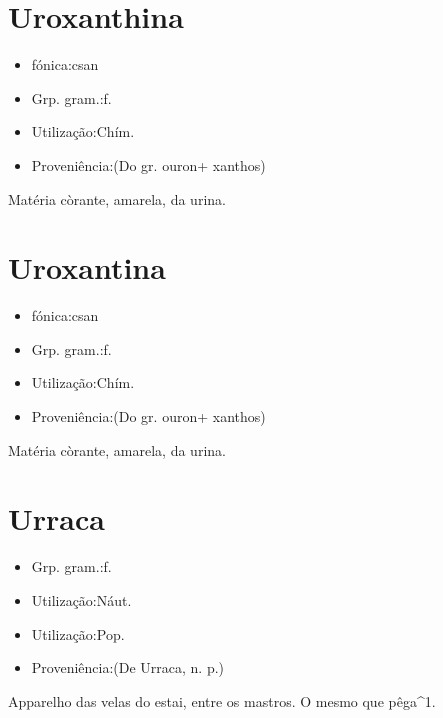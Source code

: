 \documentclass{article}
\begin{document}
\section{Uroxanthina}
\begin{itemize}
\item {fónica:csan}
\end{itemize}
\begin{itemize}
\item {Grp. gram.:f.}
\end{itemize}
\begin{itemize}
\item {Utilização:Chím.}
\end{itemize}
\begin{itemize}
\item {Proveniência:(Do gr. \textunderscore ouron\textunderscore  + \textunderscore xanthos\textunderscore )}
\end{itemize}
Matéria còrante, amarela, da urina.
\section{Uroxantina}
\begin{itemize}
\item {fónica:csan}
\end{itemize}
\begin{itemize}
\item {Grp. gram.:f.}
\end{itemize}
\begin{itemize}
\item {Utilização:Chím.}
\end{itemize}
\begin{itemize}
\item {Proveniência:(Do gr. \textunderscore ouron\textunderscore  + \textunderscore xanthos\textunderscore )}
\end{itemize}
Matéria còrante, amarela, da urina.
\section{Urraca}
\begin{itemize}
\item {Grp. gram.:f.}
\end{itemize}
\begin{itemize}
\item {Utilização:Náut.}
\end{itemize}
\begin{itemize}
\item {Utilização:Pop.}
\end{itemize}
\begin{itemize}
\item {Proveniência:(De \textunderscore Urraca\textunderscore , n. p.)}
\end{itemize}
Apparelho das velas do estai, entre os mastros.
O mesmo que \textunderscore pêga\textunderscore ^1.
\end{document}
